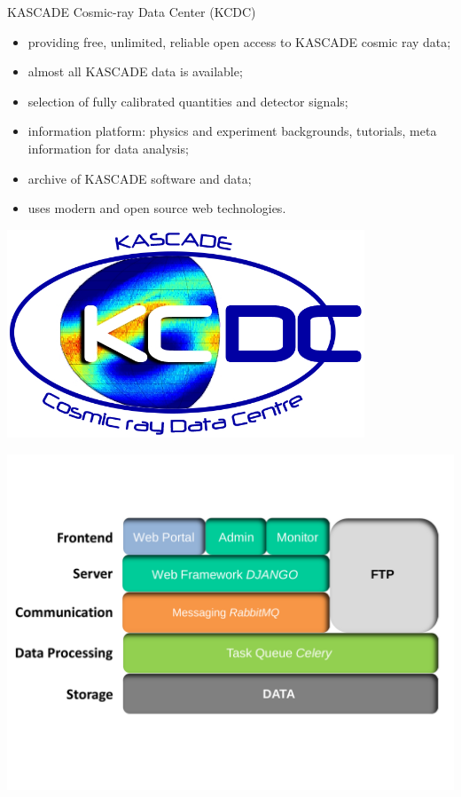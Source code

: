 \begin{frame}{KASCADE Cosmic-ray Data Center (KCDC)}
    \begin{itemize}
        \small
        \setlength{\itemsep}{0pt}
        \item providing free, unlimited, reliable open access to KASCADE cosmic ray data;
        \item almost all KASCADE data is available;
        \item selection of fully calibrated quantities and detector signals;
        \item information platform: physics and experiment backgrounds, tutorials, meta information for data analysis;
        \item archive of KASCADE software and data;
        \item uses modern and open source web technologies.
    \end{itemize}

 \begin{minipage}[c]{0.49\textwidth}
 \begin{center}
   \includegraphics[width=0.8\textwidth]{pics/KCDC-Logo.png}
 \end{center}
\end{minipage}
\begin{minipage}[c]{0.49\textwidth}
 \begin{center}
 \hspace{10em}
  \includegraphics[width=1.1\textwidth]{pics/KCDC-IT-Structure.pdf}
 \end{center}
\end{minipage}
\end{frame}


